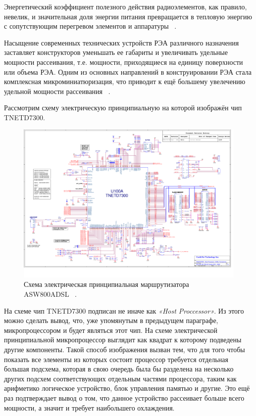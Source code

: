 Энергетический коэффициент полезного действия радиоэлементов, как
правило, невелик, и значительная доля энергии питания превращается в
тепловую энергию с сопутствующим перегревом элементов и аппаратуры
~\cite{Rotkop1976}.

Насыщение современных технических устройств РЭА различного назначения
заставляет конструкторов уменьшать ее габариты и увеличивать удельные
мощности рассеивания, т.е. мощности, приходящиеся на единицу
поверхности или объема РЭА. Одним из основных направлений в
конструировании РЭА стала комплексная микроминиатюризация, что
приводит к ещё большему увелечению удельной мощности рассеивания
~\cite{Rotkop1976}.

Рассмотрим схему электрическую принципиальную на которой изображён чип
TNETD7300.

\begin{figure}[h]
  \centering
  \includegraphics[scale = 0.20]{images/schematics-1.png}
  \caption{Схема электрическая принципиальная
    маршрутизатора ASW800ADSL ~\cite{SCHEMATICS}.}
\end{figure}

На схеме чип TNETD7300 подписан не иначе как \textit{«Host Proccessor»}.
Из этого можно сделать вывод, что, уже упомянутым в предыдущем
параграфе, микропроцессором и будет являться этот чип.  На схеме
электрической принципиальной микропроцессор выглядит как квадрат к
которому подведены другие компоненты. Такой способ изображения вызван
тем, что для того чтобы показать все элементы из которых состоит
процессор требуется отдельная большая подсхема, которая в свою очередь
была бы разделена на несколько других подсхем соответствующих
отдельным частями процессора, таким как арифметико логическое
устройство, блок управления памятью и другие. Это ещё раз подтверждает
вывод о том, что данное устройство рассеивает больше всего мощности, а
значит и требует наибольшего охлаждения.

